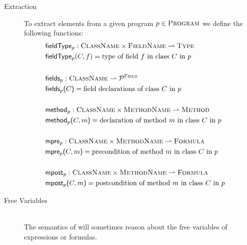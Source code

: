 \begin{description}
    \item[Extraction]
    To extract elements from a given program $p \in \textup{\textsc{Program}}$ we define the following functions:
    \begin{align*}
    	 & \textup{\textsf{fieldType$_p$}} : \textup{\textsc{ClassName}} \times \textup{\textsc{FieldName}} \rightharpoonup \textup{\textsc{Type}}                & ~ \\
    	 & \textup{\textsf{fieldType$_p$}}(C, f) = \text{type of field $f$ in class $C$ in $p$}                         &  \\
    	 & ~                                                                                       &  \\
    	 & \textup{\textsf{fields$_p$}} : \textup{\textsc{ClassName}} \rightharpoonup \mathcal{P}^{\textup{\textsc{Field}}}                  &  \\
    	 & \textup{\textsf{fields$_p$($C$)}} = \text{field declarations of class $C$ in $p$}                              &  \\
    	 & ~                                                                                       &  \\
    	 & \textup{\textsf{method$_p$}} : \textup{\textsc{ClassName}} \times \textup{\textsc{MethodName}} \rightharpoonup \textup{\textsc{Method}} &  \\
    	 & \textup{\textsf{method$_p$($C, m$)}} = \text{declaration of method $m$ in class $C$ in $p$}                   &  \\
    	 & ~                                                                                       &  \\
    	 & \textup{\textsf{mpre$_p$}} : \textup{\textsc{ClassName}} \times \textup{\textsc{MethodName}} \rightharpoonup \textup{\textsc{Formula}}  &  \\
    	 & \textup{\textsf{mpre$_p$($C, m$)}} = \text{precondition of method $m$ in class $C$ in $p$}                    &  \\
    	 & ~                                                                                       &  \\
    	 & \textup{\textsf{mpost$_p$}} : \textup{\textsc{ClassName}} \times \textup{\textsc{MethodName}} \rightharpoonup \textup{\textsc{Formula}} &  \\
    	 & \textup{\textsf{mpost$_p$($C, m$)}} = \text{postcondition of method $m$ in class $C$ in $p$}                   &
    \end{align*}
    
    \item[Free Variables]~\\
    The semantics of \svlidf will sometimes reason about the free variables of expressions or formulas.
    

\end{description}
